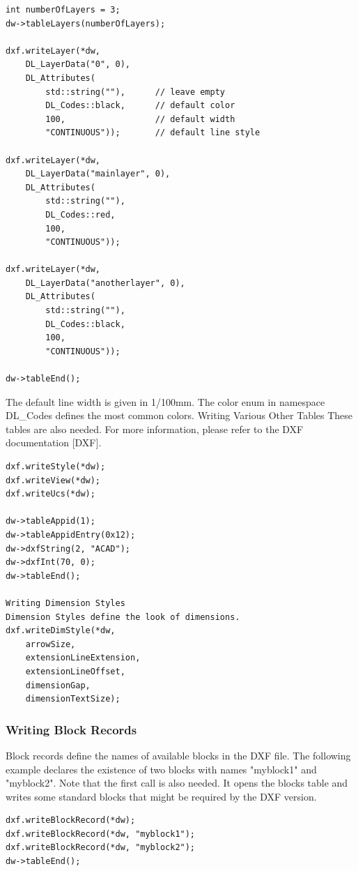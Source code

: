 \begin{verbatim}
int numberOfLayers = 3;
dw->tableLayers(numberOfLayers);

dxf.writeLayer(*dw, 
    DL_LayerData("0", 0), 
    DL_Attributes(
        std::string(""),      // leave empty
        DL_Codes::black,      // default color
        100,                  // default width
        "CONTINUOUS"));       // default line style

dxf.writeLayer(*dw, 
    DL_LayerData("mainlayer", 0), 
    DL_Attributes(
        std::string(""),
        DL_Codes::red,
        100,
        "CONTINUOUS"));

dxf.writeLayer(*dw, 
    DL_LayerData("anotherlayer", 0), 
    DL_Attributes(
        std::string(""),
        DL_Codes::black,
        100,
        "CONTINUOUS"));

dw->tableEnd();
\end{verbatim}

The default line width is given in 1/100mm. The color enum in namespace DL\_Codes defines the most common colors.
Writing Various Other Tables
These tables are also needed. For more information, please refer to the DXF documentation [DXF].
\begin{verbatim}
dxf.writeStyle(*dw);
dxf.writeView(*dw);
dxf.writeUcs(*dw);

dw->tableAppid(1);
dw->tableAppidEntry(0x12);
dw->dxfString(2, "ACAD");
dw->dxfInt(70, 0);
dw->tableEnd();

Writing Dimension Styles
Dimension Styles define the look of dimensions.
dxf.writeDimStyle(*dw, 
    arrowSize, 
    extensionLineExtension, 
    extensionLineOffset, 
    dimensionGap, 
    dimensionTextSize);
\end{verbatim}

\subsubsection*{Writing Block Records}
Block records define the names of available blocks in the DXF file. The following example declares the existence of two blocks with names "myblock1" and "myblock2". Note that the first call is also needed. It opens the blocks table and writes some standard blocks that might be required by the DXF version.
\begin{verbatim}
dxf.writeBlockRecord(*dw);
dxf.writeBlockRecord(*dw, "myblock1");
dxf.writeBlockRecord(*dw, "myblock2");
dw->tableEnd();
\end{verbatim}



